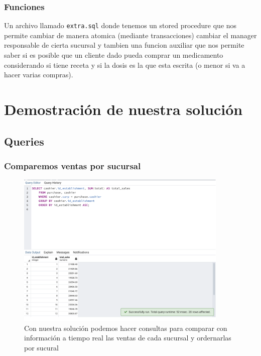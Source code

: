 \documentclass[12pt, fleqn]{report}                             %
\theoremstyle{break}                                            %
\begin{document}
        \section{Funciones}

            Un archivo llamado \texttt{extra.sql} donde tenemos un stored procedure que nos permite cambiar de manera atomica
            (mediante transacciones) cambiar el manager responsable de cierta sucursal y tambien una funcion auxiliar que nos permite
            saber si es posible que un cliente dado pueda comprar un medicamento considerando si tiene receta y si la dosis es la que esta
            escrita (o menor si va a hacer varias compras).



\part{Demostración de nuestra solución}

    \chapter{Queries}

        
        \section{Comparemos ventas por sucursal}
            
            \begin{figure}[ht]
                \includegraphics[width=0.9\textwidth]{1}
                \caption{Con nuestra solución podemos hacer consultas para comparar con información a 
                tiempo real las ventas de cada sucursal y ordernarlas por sucural}
            \end{figure}
\end{document}
